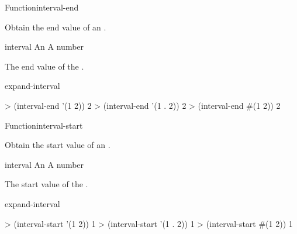 \documentclass[10pt,twoside,english,pdftex]{article}
\begin{document}
\begin{functiondoc}{Function}{interval-end}%
  { \returns{} }
%
%

\fnsyntax

\fnpurpose Obtain the end value of an .

\fnsetf
{}

\fnpackage {}

\fnmodule {}

\fnargs
\begin{args}{interval}
\arg[interval] An 
 A number
\end{args}

\fnreturns The end value of the .

\begin{alsos}{expand-interval}
\end{alsos}

\fnexamples
\begin{example}
> (interval-end '(1 2))
2
> (interval-end '(1 . 2))
2
> (interval-end #(1  2))
2
\end{example}

\end{functiondoc}


\begin{functiondoc}{Function}{interval-start}%
  { \returns{} }
%
%

\fnsyntax

\fnpurpose Obtain the start value of an .

\fnsetf
{}

\fnpackage {}

\fnmodule {}

\fnargs
\begin{args}{interval}
\arg[interval] An 
 A number
\end{args}

\fnreturns The start value of the .

\begin{alsos}{expand-interval}
\end{alsos}

\fnexamples
\begin{example}
> (interval-start '(1 2))
1
> (interval-start '(1 . 2))
1
> (interval-start #(1  2))
1
\end{example}

\end{functiondoc}
\end{document}
